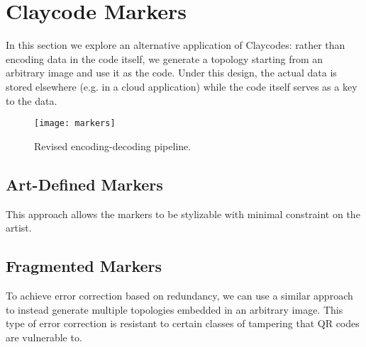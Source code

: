 \section{Claycode Markers}

In this section we explore an alternative application of Claycodes: rather than encoding data in the code itself, we generate a topology starting from an arbitrary image and use it as the code. Under this design, the actual data is stored elsewhere (e.g. in a cloud application) while the  code itself serves as a key to the data.

\begin{figure}[h]
    \caption{Revised encoding-decoding pipeline.}
    \centering
    \texttt{[image: markers]}
\end{figure}

\subsection[artDefined]{Art-Defined Markers}

This approach allows the markers to be stylizable with minimal constraint on the artist.

\subsection[fragments]{Fragmented Markers}

To achieve error correction based on redundancy, we can use a similar approach to instead generate multiple topologies embedded in an arbitrary image. This type of error correction is resistant to certain classes of tampering that QR codes are vulnerable to.
